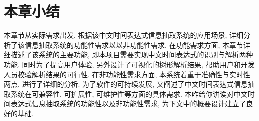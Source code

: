 \section{本章小结}

本章节从实际需求出发, 根据该中文时间表达式信息抽取系统的应用场景, 详细分析了该信息抽取系统的功能性需求以以非功能性需求.
在功能需求方面, 本章节详细描述了该系统的主要功能, 即本项目需要实现中文时间表达式的识别与解析两种功能. 
同时为了提高用户体验, 另外设计了可视化的树形解析结果, 帮助用户和开发人员校验解析结果的可行性.
在非功能性需求方面, 本系统着重于准确性与实时性两点, 进行了详细的分析. 
为了软件的可持续发展, 又阐述了中文时间表达式信息抽取系统在可兼容性, 可扩展性, 可维护性等方面的具体需求.
本咋给你讲诶对中文时间表达式信息抽取系统的功能性以及非功能性需求, 为下文中的概要设计建立了良好的基础.

